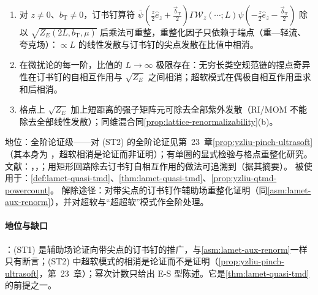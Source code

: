 \begin{assumption}\label{asm:lamet-staple}
\begin{enumerate}[label=(ST\arabic*),leftmargin=3.2em,itemsep=1pt,topsep=2pt]
\item 对 $z\neq0$、$b_{\mathrm T}\neq0$，订书钉算符 $\bar\psi(\frac z2\hat e_z+\frac{\vec b_{\mathrm T}}2)\Gamma\mathcal W_z(\cdots;L)\psi(-\frac z2\hat e_z-\frac{\vec b_{\mathrm T}}2)$ 除以 $\sqrt{Z_E(2L,b_{\mathrm T},\mu)}$ 后乘法可重整，重整化因子只依赖于端点（重—轻流、夸克场）：$\propto L$ 的线性发散与订书钉的尖点发散在比值中相消。
\item 在微扰论的每一阶，比值的 $L\to\infty$ 极限存在：无穷长类空规范链的捏点奇异性在订书钉的自相互作用与 $\sqrt{Z_E}$ 之间相消；超软模式在偶极自相互作用重求和后相消。
\item 格点上 $\sqrt{Z_E}$ 加上短距离的强子矩阵元可除去全部紫外发散（RI/MOM 不能除去全部线性发散）；同维混合同\cref{prop:lattice-renormalizability}(b)。
\end{enumerate}
地位：全阶论证级——对 (ST2) 的全阶论证见第~23~章\cref{prop:yzliu-pinch-ultrasoft}（其本身为 \tagA，超软相消是论证而非证明）；有单圈的显式检验与格点重整化研究。
文献：\cite{Ji:2019ewn}，\cite[第~3--4~节]{Liu:2022nnk}，\cite{Ebert:2022fmh,Ebert:2019tvc,Constantinou:2019vyb,Alexandrou:2023ucc}；用矩形回路除去订书钉自相互作用的做法可追溯到\cite{Collins:2008ht,Ji:2018hvs}（据其摘要）。
被使用于：\cref{def:lamet-quasi-tmd}、\cref{thm:lamet-quasi-tmd}、\cref{prop:yzliu-qtmd-powercount}。
解除途径：对带尖点的订书钉作辅助场重整化证明（同\cref{asm:lamet-aux-renorm}），并对超软与“超超软”模式作全阶处理。
\end{assumption}

\paragraph{地位与缺口}
\tagA：(ST1) 是辅助场论证向带尖点的订书钉的推广，与\cref{asm:lamet-aux-renorm}一样只有断言；(ST2) 中超软模式的相消是论证而不是证明（\cref{prop:yzliu-pinch-ultrasoft}，第~23~章）；幂次计数只给出 E-S 型陈述。它是\cref{thm:lamet-quasi-tmd}的前提之一。

